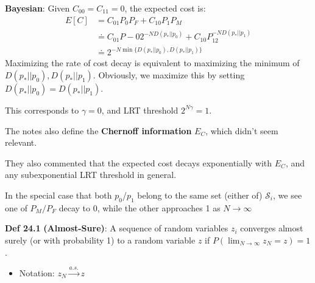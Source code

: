 \documentclass[12pt]{article} %
\begin{document}
\separate

\textbf{Bayesian}: Given $C_{00} = C_{11} = 0$, the expected cost is:
\begin{align*}
    E[C]
    &= C_{01}P_0P_F + C_{10}P_1P_M \\
    &\doteq
    C_{01}P-0 2^{-ND(p_* || p_0)}
    +
    C_{10}P_12^{-ND(p_*||p_1)} \\
    &\doteq
    2^{-N \min\{D(p_*||p_0), D(p_*||p_1)\}}
\end{align*}
Maximizing the rate of cost decay is equivalent to maximizing the minimum of $D(p_*||p_0), D(p_*||p_1)$. Obviously, we maximize this by setting $D(p_*||p_0) = D(p_*||p_1)$.

This corresponds to $\gamma = 0$, and LRT threshold $2^{N\gamma} = 1$.

The notes also define the \textbf{Chernoff information} $E_C$, which didn't seem relevant.

They also commented that the expected cost decays exponentially with $E_C$, and any subexponential LRT threshold in general.


\separate

In the special case that both $p_0$/$p_1$ belong to the same set (either of) $\mathcal{S}_i$, we see one of $P_M/P_F$ decay to 0, while the other approaches 1 as $N \rightarrow \infty$


\newpage
{}

\textbf{Def 24.1} \textbf{(Almost-Sure)}: A sequence of random variables $z_i$ converges almost surely (or with probability 1) to a random variable $z$ if $P(\lim_{N \rightarrow \infty} z_N = z) = 1$.
\begin{itemize}[topsep=-1pt, itemsep=-1pt]
    \item 
Notation: $z_N \xrightarrow{a.s.} z$
\end{itemize}
\end{document}

